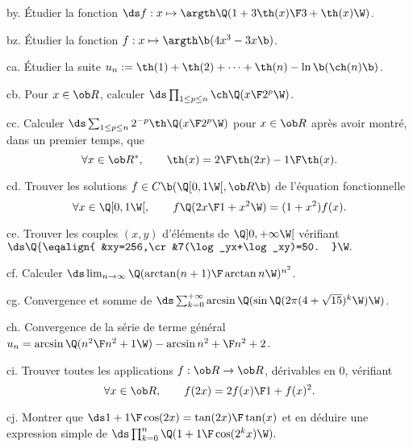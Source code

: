 \exo [Level=1,Fight=2,Learn=1,Field=\Fonctions,Type=\Exercices,Origin=] by. 
Étudier la fonction $\ds f:x\mapsto\argth\Q({1+3\th(x)\F3+\th(x)}\W)$. 

\exo [Level=1,Fight=2,Learn=1,Field=\Fonctions,Type=\Exercices,Origin=] bz. 
Étudier la fonction $f:x\mapsto\argth\b(4x^3-3x\b)$. 

\exo [Level=1,Fight=1,Learn=1,Field=\Suites|\TrigonométrieHyperbolique,Type=\Exercices,Origin=] ca. 
Étudier la suite $u_n:=\th(1)+\th(2)+\cdots+\th(n)-\ln\b(\ch(n)\b)$. 

\exo [Level=1,Fight=1,Learn=0,Field=\TrigonométrieHyperbolique,Type=\Exercices,Origin=] cb. 
Pour $x\in\ob R$, calculer $\ds\prod_{1\le p\le n}\ch\Q({x\F 2^p}\W)$. 

\exo [Level=1,Fight=1,Learn=1,Field=\TrigonométrieHyperbolique,Type=\Exercices,Origin=] cc. 
Calculer $\ds\sum_{1\le p\le n}2^{-p}\th\Q({x\F2^p}\W)$ pour $x\in\ob R$ après avoir montré, dans un premier temps, que 
$$
\forall x\in\ob R^*, \qquad \th(x)={2\F\th(2x)}-{1\F \th(x)}.
$$

\exo  [Level=1,Fight=3,Learn=1,Field=\Fonctions|\Trigonométrie,Type=\Exercices,Origin=] cd. 
Trouver les solutions $f\in\sc C\b(\Q[0,1\W[,\ob R\b)$ de l'équation fonctionnelle
$$
\forall x\in\Q[0,1\W[,\qquad f\Q({2x\F1+x^2}\W)=(1+x^2)f(x).
$$

\exo [Level=1,Fight=1,Learn=0,Field=\Fonctions,Type=\Exercices,Origin=] ce. 
Trouver les couples $(x,y)$ d'éléments de $\Q]0,+\infty\W[$ vérifiant 
$\ds 
\Q\{\eqalign{
&xy=256,\cr
&7(\log_yx+\log_xy)=50.
}\W.
$

\exo [Level=1,Fight=2,Learn=1,Field=\DéveloppementsLimités,Type=\Exercices,Origin=] cf. 
Calculer $\ds \lim_{n\to\infty}\Q({\arctan(n+1)\F\arctan n}\W)^{n^2}$. 

\exo [Level=2,Fight=3,Learn=1,Field=\Séries,Type=\Exercices,Origin=] cg. 
Convergence et somme de $\ds\sum_{k=0}^{+\infty}\arcsin\Q(\sin\Q(2\pi(4+\sqrt{15})^k\W)\W)$. 

\exo [Level=2,Fight=2,Learn=1,Field=\Séries,Type=\Exercices,Origin=] ch. 
Convergence de la série de terme général $u_n=\arcsin\Q({n^2\F n^2+1}\W)-\arcsin{n^2+\F n^2+2}$. 

\exo [Level=1,Fight=3,Learn=1,Field=\Fonctions,Type=\Exercices,Origin=] ci. 
Trouver toutes les applications $f:\ob R\to\ob R$, dérivables en $0$, vérifiant 
$$
\forall x\in\ob R, \qquad f(2x)={2f(x)\F1+f(x)^2}.
$$

\exo [Level=1,Fight=1,Learn=1,Field=\Trigonométrie,Type=\Exercices,Origin=] cj. 
Montrer que $\ds1+{1\F\cos(2x)}={\tan(2x)\F\tan(x)}$ et en déduire une expression simple de $\ds
\prod_{k=0}^n\Q(1+{1\F\cos(2^kx)}\W).
$

